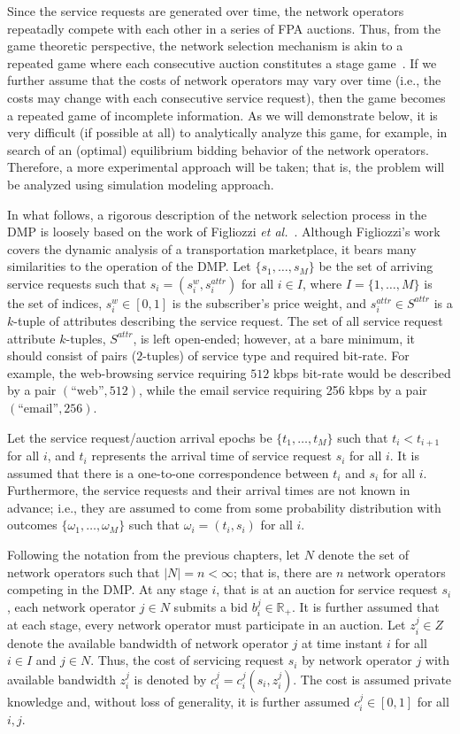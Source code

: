 Since the service requests are generated over time, the network operators repeatadly compete with each other in a series of FPA auctions. Thus, from the game theoretic perspective, the network selection mechanism is akin to a repeated game where each consecutive auction constitutes a stage game~\cite{BasarOlsder1999, Gibbons92}. If we further assume that the costs of network operators may vary over time (i.e., the costs may change with each consecutive service request), then the game becomes a repeated game of incomplete information. As we will demonstrate below, it is very difficult (if possible at all) to analytically analyze this game, for example, in search of an (optimal) equilibrium bidding behavior of the network operators. Therefore, a more experimental approach will be taken; that is, the problem will be analyzed using simulation modeling approach.

In what follows, a rigorous description of the network selection process in the DMP is loosely based on the work of Figliozzi \emph{et al.}~\cite{FigliozziJaillet2008}. Although Figliozzi's work covers the dynamic analysis of a transportation marketplace, it bears many similarities to the operation of the DMP. Let $\{s_1,\ldots,s_M\}$ be the set of arriving service requests such that $s_i = (s^w_i, s^{attr}_i)$ for all $i\in I$, where $I=\{1,\ldots,M\}$ is the set of indices, $s^w_i\in [0,1]$ is the subscriber's price weight, and $s^{attr}_i\in S^{attr}$ is a $k$-tuple of attributes describing the service request. The set of all service request attribute $k$-tuples, $S^{attr}$, is left open-ended; however, at a bare minimum, it should consist of pairs ($2$-tuples) of service type and required bit-rate. For example, the web-browsing service requiring $512$ kbps bit-rate would be described by a pair $(\text{``web''}, 512)$, while the email service requiring 256 kbps by a pair $(\text{``email''}, 256)$.

Let the service request/auction arrival epochs be $\{t_1,\ldots,t_M\}$ such that $t_i < t_{i+1}$ for all $i$, and $t_i$ represents the arrival time of service request $s_i$ for all $i$. It is assumed that there is a one-to-one correspondence between $t_i$ and $s_i$ for all $i$. Furthermore, the service requests and their arrival times are not known in advance; i.e., they are assumed to come from some probability distribution with outcomes $\{\omega_1,\ldots,\omega_M\}$ such that $\omega_i = (t_i, s_i)$ for all $i$.

Following the notation from the previous chapters, let $N$ denote the set of network operators such that $|N| = n < \infty$; that is, there are $n$ network operators competing in the DMP. At any stage $i$, that is at an auction for service request $s_i$, each network operator $j\in N$ submits a bid $b^j_i\in\mathbb{R}_+$. It is further assumed that at each stage, every network operator must participate in an auction. Let $z^j_i\in Z$ denote the available bandwidth of network operator $j$ at time instant $i$ for all $i\in I$ and $j\in N$. Thus, the cost of servicing request $s_i$ by network operator $j$ with available bandwidth $z^j_i$ is denoted by $c^j_i = c^j_i(s_i,z^j_i)$. The cost is assumed private knowledge and, without loss of generality, it is further assumed $c^j_i\in [0,1]$ for all $i,j$.

